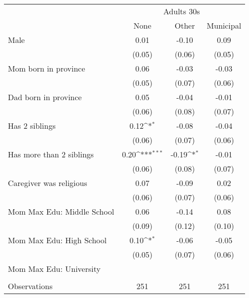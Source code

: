 {
\def\sym#1{\ifmmode^{#1}\else\(^{#1}\)\fi}
\begin{tabular}{l*{3}{c}}
\toprule
& \multicolumn{3}{c}{Adults 30s} \\
                    &\multicolumn{1}{c}{None}&\multicolumn{1}{c}{Other}&\multicolumn{1}{c}{Municipal}\\
\midrule
Male                &        0.01         &       -0.10         &        0.09         \\
                    &      (0.05)         &      (0.06)         &      (0.05)         \\
\addlinespace
Mom born in province&        0.06         &       -0.03         &       -0.03         \\
                    &      (0.05)         &      (0.07)         &      (0.06)         \\
\addlinespace
Dad born in province&        0.05         &       -0.04         &       -0.01         \\
                    &      (0.06)         &      (0.08)         &      (0.07)         \\
\addlinespace
Has 2 siblings      &        0.12\sym{*}  &       -0.08         &       -0.04         \\
                    &      (0.06)         &      (0.07)         &      (0.06)         \\
\addlinespace
Has more than 2 siblings&        0.20\sym{***}&       -0.19\sym{*}  &       -0.01         \\
                    &      (0.06)         &      (0.08)         &      (0.07)         \\
\addlinespace
Caregiver was religious&        0.07         &       -0.09         &        0.02         \\
                    &      (0.06)         &      (0.07)         &      (0.06)         \\
\addlinespace
Mom Max Edu: Middle School&        0.06         &       -0.14         &        0.08         \\
                    &      (0.09)         &      (0.12)         &      (0.10)         \\
\addlinespace
Mom Max Edu: High School&        0.10\sym{*}  &       -0.06         &       -0.05         \\
                    &      (0.05)         &      (0.07)         &      (0.06)         \\
\addlinespace
Mom Max Edu: University&                &               &                 \\
                    &                &               &                 \\
\midrule
Observations        &         251         &         251         &         251         \\
\bottomrule
\end{tabular}
}
